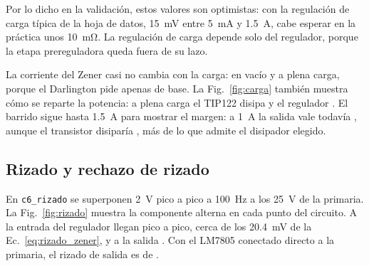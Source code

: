 Por lo dicho en la validación, estos valores son optimistas: con la regulación de carga típica de la hoja de datos, \SI{15}{\milli\volt} entre \SI{5}{\milli\ampere} y \SI{1,5}{\ampere}, cabe esperar en la práctica unos \SI{10}{\milli\ohm}. La regulación de carga depende solo del regulador, porque la etapa prereguladora queda fuera de su lazo.

La corriente del Zener casi no cambia con la carga:  en vacío y  a plena carga, porque el Darlington pide apenas  de base. La Fig.~\ref{fig:carga} también muestra cómo se reparte la potencia: a plena carga el TIP122 disipa  y el regulador . El barrido sigue hasta \SI{1,5}{\ampere} para mostrar el margen: a \SI{1}{\ampere} la salida vale todavía , aunque el transistor disiparía , más de lo que admite el disipador elegido.

\subsection{Rizado y rechazo de rizado}
En \texttt{c6\_rizado} se superponen \SI{2}{\volt} pico a pico a \SI{100}{\hertz} a los \SI{25}{\volt} de la primaria. La Fig.~\ref{fig:rizado} muestra la componente alterna en cada punto del circuito. A la entrada del regulador llegan  pico a pico, cerca de los \SI{20,4}{\milli\volt} de la Ec.~\eqref{eq:rizado_zener}, y a la salida . Con el LM7805 conectado directo a la primaria, el rizado de salida es de .

